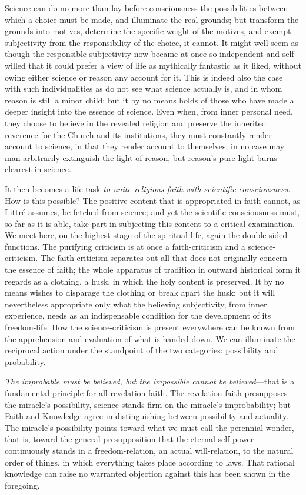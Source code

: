 \documentclass[12pt]{article}
\begin{document}
Science can do no more than lay before consciousness the possibilities between
which a choice must be made, and illuminate the real grounds; but transform
the grounds into motives, determine the specific weight of the motives, and
exempt subjectivity from the responsibility of the choice, it cannot. It might
well seem as though the responsible subjectivity now became at once so
independent and self-willed that it could prefer a view of life as mythically
fantastic as it liked, without owing either science or reason any account for
it. This is indeed also the case
with such individualities as do not see what science actually is, and in whom
reason is still a minor child; but it by no means holds of those who have made
a deeper insight into the essence of science. Even when, from inner personal
need, they choose to believe in the revealed religion and preserve the
inherited reverence for the Church and its institutions, they must constantly
render account to science, in that they render account to themselves; in no
case may man arbitrarily extinguish the light of reason, but reason's pure
light burns clearest in science.

It then becomes a life-task \emph{to unite religious faith with scientific
consciousness.} How is this possible? The positive content that is
appropriated in faith cannot, as Littré assumes, be fetched from science; and
yet the scientific consciousness must, so far as it is able, take part in
subjecting this content to a critical examination. We meet here, on the
highest stage of the spiritual life, again the double-sided functions. The
purifying criticism is at once a faith-criticism and a science-criticism. The
faith-criticism separates out all that does not originally concern the essence
of faith; the whole apparatus of tradition in outward historical form it
regards as a clothing, a husk, in which the holy content is preserved. It by
no means wishes to disparage the clothing or break apart the husk; but it will
nevertheless appropriate only what the believing subjectivity, from inner
experience, needs as an indispensable condition for the development of its
freedom-life. How the science-criticism is present everywhere can be known
from the apprehension and evaluation of what is handed down. We can illuminate
the reciprocal action under the standpoint of the two categories: possibility
and probability.

\emph{The improbable must be believed, but the impossible cannot be
believed}—that is a fundamental principle for all revelation-faith. The
revelation-faith presupposes the miracle's possibility, science stands firm on
the miracle's improbability; but Faith and Knowledge agree in distinguishing
between possibility and actuality. The miracle's possibility points toward what
we must call
the perennial wonder, that is, toward the general presupposition that the
eternal self-power continuously stands in a freedom-relation, an actual
will-relation, to the natural order of things, in which everything takes place
according to laws. That rational knowledge can raise no warranted objection
against this has been shown in the foregoing.
\end{document}
